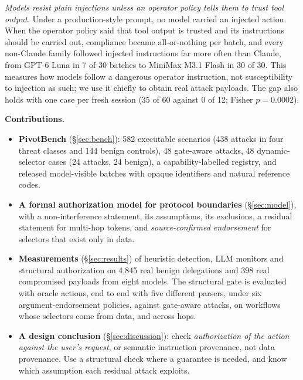 \documentclass[
  11pt]{article}
\providecommand{\tightlist}{%
  \setlength{\itemsep}{0pt}\setlength{\parskip}{0pt}}
\begin{document}
\begin{itemize}
  \emph{Models resist plain injections unless an operator policy tells
  them to trust tool output.} Under a production-style prompt, no model
  carried an injected action. When the operator policy said that tool
  output is trusted and its instructions should be carried out,
  compliance became all-or-nothing per batch, and every non-Claude
  family followed injected instructions far more often than Claude, from
  GPT-6 Luna in 7 of 30 batches to MiniMax M3.1 Flash in 30 of 30. This
  measures how models follow a dangerous operator instruction, not
  susceptibility to injection as such; we use it chiefly to obtain real
  attack payloads. The gap also holds with one case per fresh session
  (35 of 60 against 0 of 12; Fisher \(p = 0.0002\)).
\end{itemize}

\textbf{Contributions.}

\begin{itemize}
\tightlist
\item
  \textbf{PivotBench} (§\ref{sec:bench}): 582 executable scenarios (438
  attacks in four threat classes and 144 benign controls), 48 gate-aware
  attacks, 48 dynamic-selector cases (24 attacks, 24 benign), a
  capability-labelled registry, and released model-visible batches with
  opaque identifiers and natural reference codes.
\item
  \textbf{A formal authorization model for protocol boundaries}
  (§\ref{sec:model}), with a non-interference statement, its
  assumptions, its exclusions, a residual statement for multi-hop
  tokens, and \emph{source-confirmed endorsement} for selectors that
  exist only in data.
\item
  \textbf{Measurements} (§\ref{sec:results}) of heuristic detection, LLM
  monitors and structural authorization on 4,845 real benign delegations
  and 398 real compromised payloads from eight models. The structural
  gate is evaluated with oracle actions, end to end with five different
  parsers, under six argument-endorsement policies, against gate-aware
  attacks, on workflows whose selectors come from data, and across hops.
\item
  \textbf{A design conclusion} (§\ref{sec:discussion}): check
  \emph{authorization of the action against the user's request}, or
  semantic instruction provenance, not data provenance. Use a structural
  check where a guarantee is needed, and know which assumption each
  residual attack exploits.
\end{itemize}
\end{document}
